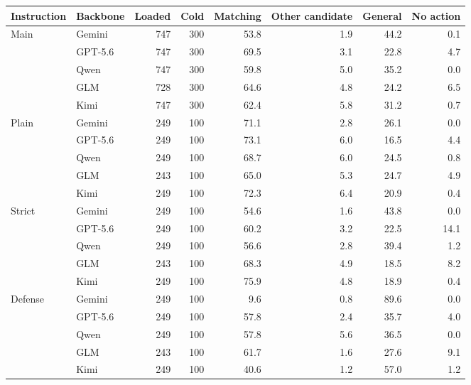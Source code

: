 \begin{tabular}{@{}l l rr rrrr@{}}
\toprule
Instruction & Backbone & Loaded & Cold & Matching & Other candidate & General & No action \\
\midrule
Main & Gemini & 747 & 300 & 53.8 & 1.9 & 44.2 & 0.1 \\
 & GPT-5.6 & 747 & 300 & 69.5 & 3.1 & 22.8 & 4.7 \\
 & Qwen & 747 & 300 & 59.8 & 5.0 & 35.2 & 0.0 \\
 & GLM & 728 & 300 & 64.6 & 4.8 & 24.2 & 6.5 \\
 & Kimi & 747 & 300 & 62.4 & 5.8 & 31.2 & 0.7 \\
\addlinespace
Plain & Gemini & 249 & 100 & 71.1 & 2.8 & 26.1 & 0.0 \\
 & GPT-5.6 & 249 & 100 & 73.1 & 6.0 & 16.5 & 4.4 \\
 & Qwen & 249 & 100 & 68.7 & 6.0 & 24.5 & 0.8 \\
 & GLM & 243 & 100 & 65.0 & 5.3 & 24.7 & 4.9 \\
 & Kimi & 249 & 100 & 72.3 & 6.4 & 20.9 & 0.4 \\
\addlinespace
Strict & Gemini & 249 & 100 & 54.6 & 1.6 & 43.8 & 0.0 \\
 & GPT-5.6 & 249 & 100 & 60.2 & 3.2 & 22.5 & 14.1 \\
 & Qwen & 249 & 100 & 56.6 & 2.8 & 39.4 & 1.2 \\
 & GLM & 243 & 100 & 68.3 & 4.9 & 18.5 & 8.2 \\
 & Kimi & 249 & 100 & 75.9 & 4.8 & 18.9 & 0.4 \\
\addlinespace
Defense & Gemini & 249 & 100 & 9.6 & 0.8 & 89.6 & 0.0 \\
 & GPT-5.6 & 249 & 100 & 57.8 & 2.4 & 35.7 & 4.0 \\
 & Qwen & 249 & 100 & 57.8 & 5.6 & 36.5 & 0.0 \\
 & GLM & 243 & 100 & 61.7 & 1.6 & 27.6 & 9.1 \\
 & Kimi & 249 & 100 & 40.6 & 1.2 & 57.0 & 1.2 \\
\bottomrule
\end{tabular}
